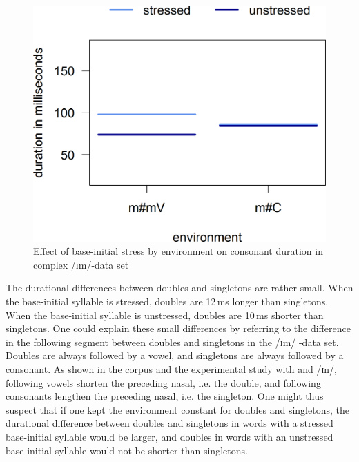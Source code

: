  \begin{figure}
 	
 	\includegraphics [scale=0.5] {images/Experiment/imModelInterEnvStress}
 	\caption{Effect of base-initial stress by environment on consonant duration in complex /ɪm/-data set}
 	\label{fig:NumNasal imComplex experiment}
 	
 \end{figure}



The durational differences between doubles and singletons are rather small.  When the base-initial syllable is stressed, doubles are 12\,ms longer than singletons. When the base-initial syllable is unstressed, doubles are 10\,ms shorter than singletons. 
  One could explain these small differences by referring to the difference in the following segment between doubles and singletons in the /ɪm/ -data set. Doubles are always followed by a vowel, and singletons are always followed by a consonant. As shown in the corpus and the experimental study with  and /ɪn/, following vowels shorten the preceding nasal, i.e. the double, and following consonants lengthen the preceding nasal, i.e. the singleton. One might thus suspect that if one kept the environment constant for doubles and singletons, the durational difference between doubles and singletons in words with a stressed base-initial syllable would be larger, and doubles in words with an unstressed base-initial syllable would not be shorter than singletons. 

